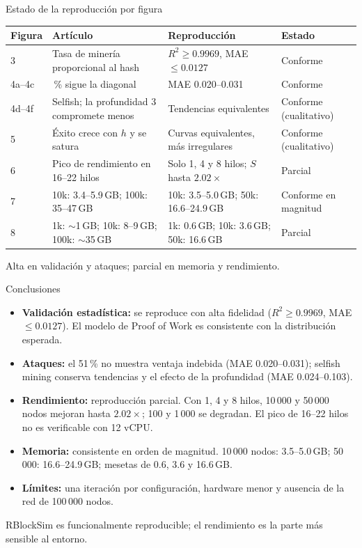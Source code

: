 \documentclass[aspectratio=169,11pt]{beamer}
\begin{document}
\begin{frame}{Estado de la reproducción por figura}
\scriptsize
\renewcommand{\arraystretch}{1.10}
\begin{tabularx}{\textwidth}{@{}l>{\raggedright\arraybackslash}X>{\raggedright\arraybackslash}X>{\raggedright\arraybackslash}p{2.5cm}@{}}
\toprule
\textbf{Figura} & \textbf{Artículo} & \textbf{Reproducción} & \textbf{Estado} \\
\midrule
3 & Tasa de minería proporcional al hash & $R^2 \ge 0.9969$, MAE $\le 0.0127$ & Conforme \\
4a--4c & 51\,\% sigue la diagonal & MAE 0.020--0.031 & Conforme \\
4d--4f & Selfish; la profundidad 3 compromete menos & Tendencias equivalentes & Conforme (cualitativo) \\
5 & Éxito crece con $h$ y se satura & Curvas equivalentes, más irregulares & Conforme (cualitativo) \\
6 & Pico de rendimiento en 16--22 hilos & Solo 1, 4 y 8 hilos; $S$ hasta $2.02\times$ & Parcial \\
7 & 10k: 3.4--5.9\,GB; 100k: 35--47\,GB & 10k: 3.5--5.0\,GB; 50k: 16.6--24.9\,GB & Conforme en magnitud \\
8 & 1k: $\sim$1\,GB; 10k: 8--9\,GB; 100k: $\sim$35\,GB & 1k: 0.6\,GB; 10k: 3.6\,GB; 50k: 16.6\,GB & Parcial \\
\bottomrule
\end{tabularx}
\vspace{.4em}
\begin{center}\small Alta en validación y ataques; parcial en memoria y rendimiento.\end{center}
\end{frame}

\begin{frame}{Conclusiones}
\begin{itemize}
  \item \textbf{Validación estadística:} se reproduce con alta fidelidad ($R^2 \ge 0.9969$, MAE $\le 0.0127$). El modelo de Proof of Work es consistente con la distribución esperada.
  \item \textbf{Ataques:} el 51\,\% no muestra ventaja indebida (MAE 0.020--0.031); selfish mining conserva tendencias y el efecto de la profundidad (MAE 0.024--0.103).
  \item \textbf{Rendimiento:} reproducción parcial. Con 1, 4 y 8 hilos, 10\,000 y 50\,000 nodos mejoran hasta $2.02\times$; 100 y 1\,000 se degradan. El pico de 16--22 hilos no es verificable con 12 vCPU.
  \item \textbf{Memoria:} consistente en orden de magnitud. 10\,000 nodos: 3.5--5.0\,GB; 50\,000: 16.6--24.9\,GB; mesetas de 0.6, 3.6 y 16.6\,GB.
  \item \textbf{Límites:} una iteración por configuración, hardware menor y ausencia de la red de 100\,000 nodos.
\end{itemize}
\vfill
\begin{center}\color{teal}\large RBlockSim es funcionalmente reproducible; el rendimiento es la parte más sensible al entorno.\end{center}
\end{frame}
\end{document}
